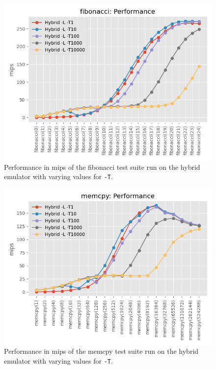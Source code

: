 \begin{figure}[H]
    \centering
    \includegraphics[scale=0.75]{output/graphs/tests/hybrid_t/fibonacci/mips.png}
    \caption{Performance in mips of the fibonacci test suite run on the hybrid emulator with varying values for \texttt{-T}.}
    \label{figure:hybrid-t-fibonacci-mips}
\end{figure}

\begin{figure}[H]
    \centering
    \includegraphics[scale=0.75]{output/graphs/tests/hybrid_t/memcpy/mips.png}
    \caption{Performance in mips of the memcpy test suite run on the hybrid emulator with varying values for \texttt{-T}.}
    \label{figure:hybrid-t-memcpy-mips}
\end{figure}

